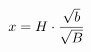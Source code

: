 \documentclass[preview]{standalone}
\begin{document}
\begin{align*}
\special{dvisvgm:raw <g id='unique000'>}x=H\cdot\frac{\sqrt{b}}{\sqrt{B}}\special{dvisvgm:raw </g>}
\end{align*}
\end{document}
